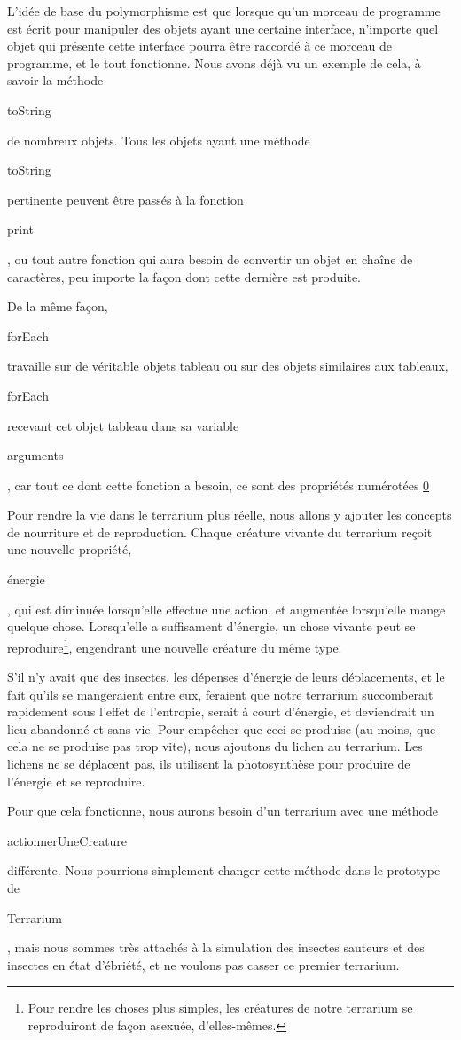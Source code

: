 \documentclass{FramateX}
\renewcommand{\texttt}[1]{\begin{sffamily}{#1}\end{sffamily}}
\begin{document}
L'idée de base du polymorphisme est que lorsque qu'un morceau de
programme est écrit pour manipuler des objets ayant une certaine
interface, n'importe quel objet qui présente cette interface pourra être
raccordé à ce morceau de programme, et le tout fonctionne. Nous avons
déjà vu un exemple de cela, à savoir la méthode \texttt{toString} de
nombreux objets. Tous les objets ayant une méthode \texttt{toString}
pertinente peuvent être passés à la fonction \texttt{print}, ou tout
autre fonction qui aura besoin de convertir un objet en chaîne de
caractères, peu importe la façon dont cette dernière est produite.

De la même façon, \texttt{forEach} travaille sur de véritable objets
tableau ou sur des objets similaires aux tableaux, \texttt{forEach}
recevant cet objet tableau dans sa variable \texttt{arguments}, car tout
ce dont cette fonction a besoin, ce sont des propriétés numérotées
\href{,\%20\textbar{}1\textbar{},\%20et\%20ainsi\%20de\%20suite\%20pour\%20tous\%0Ales\%20éléments\%20du\%20tableau.}{0}

\begin{center}\end{center}

Pour rendre la vie dans le terrarium plus réelle, nous allons y ajouter
les concepts de nourriture et de reproduction. Chaque créature vivante
du terrarium reçoit une nouvelle propriété, \texttt{énergie}, qui est
diminuée lorsqu'elle effectue une action, et augmentée lorsqu'elle mange
quelque chose. Lorsqu'elle a suffisament d'énergie, un chose vivante
peut se reproduire\footnote{Pour rendre les choses plus simples, les créatures de notre terrarium se reproduiront de façon asexuée, d'elles-mêmes.}, engendrant une nouvelle
créature du même type.

S'il n'y avait que des insectes, les dépenses d'énergie de leurs
déplacements, et le fait qu'ils se mangeraient entre eux, feraient que
notre terrarium succomberait rapidement sous l'effet de l'entropie,
serait à court d'énergie, et deviendrait un lieu abandonné et sans vie.
Pour empêcher que ceci se produise (au moins, que cela ne se produise
pas trop vite), nous ajoutons du lichen au terrarium. Les lichens ne se
déplacent pas, ils utilisent la photosynthèse pour produire de l'énergie
et se reproduire.

Pour que cela fonctionne, nous aurons besoin d'un terrarium avec une
méthode \texttt{actionnerUneCreature} différente. Nous pourrions
simplement changer cette méthode dans le prototype de
\texttt{Terrarium}, mais nous sommes très attachés à la simulation des
insectes sauteurs et des insectes en état d'ébriété, et ne voulons pas
casser ce premier terrarium.
\end{document}
